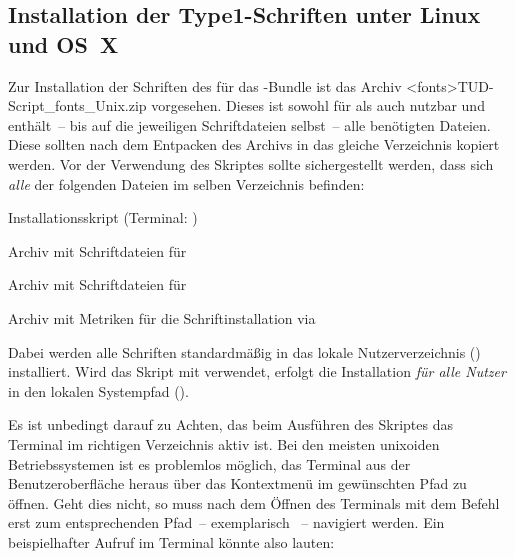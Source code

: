 \subsection{%
  Installation der Type1-Schriften unter Linux und OS~X%
  \label{sec:install:unix}%
}
Zur Installation der Schriften des \CDs für das \TUDScript-Bundle ist das 
Archiv \GitHubDownload*<fonts>{TUD-Script_fonts_Unix.zip} vorgesehen. Dieses 
ist sowohl für  als auch 
 nutzbar und enthält~-- bis auf die jeweiligen 
Schriftdateien selbst~-- alle benötigten Dateien. Diese sollten nach dem 
Entpacken des Archivs in das gleiche Verzeichnis kopiert werden. Vor der 
Verwendung des Skriptes  sollte sichergestellt 
werden, dass sich \emph{alle} der folgenden Dateien im selben Verzeichnis 
befinden:
%
\settowidth{}%
\begin{description}[labelwidth=\tudscrdim,labelsep=1em]
  \item[\File*{tudscr_fonts_install.sh}]Installationsskript
    (Terminal: )
  \item[\File*{Univers_PS.zip}]Archiv mit Schriftdateien für \Univers
  \item[\File*{DIN_Bd_PS.zip}]Archiv mit Schriftdateien für \DIN
  \item[\File*{tudscr_fonts_install.zip}]Archiv mit Metriken für die
    Schriftinstallation via 
\end{description}
%
%
Dabei werden alle Schriften standardmäßig in das lokale Nutzerverzeichnis 
() installiert. Wird das Skript mit  verwendet, 
erfolgt die Installation \emph{für alle Nutzer} in den lokalen Systempfad 
().

Es ist unbedingt darauf zu Achten, das beim Ausführen des Skriptes das Terminal 
im richtigen Verzeichnis aktiv ist. Bei den meisten unixoiden Betriebssystemen 
ist es problemlos möglich, das Terminal aus der Benutzeroberfläche heraus über 
das Kontextmenü im gewünschten Pfad zu öffnen. Geht dies nicht, so muss nach 
dem Öffnen des Terminals mit dem Befehl  erst zum entsprechenden 
Pfad~-- exemplarisch ~-- 
navigiert werden. Ein beispielhafter Aufruf im Terminal könnte also lauten:
%
\begin{quoting}
\newline
{}
\end{quoting}



